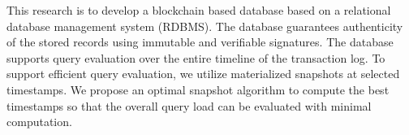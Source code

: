 This research is to develop a blockchain based database based on a relational database management system (RDBMS). The database guarantees authenticity of the stored records using immutable and verifiable signatures.  The database supports query evaluation over the entire timeline of the transaction log. To support efficient query evaluation, we utilize materialized snapshots at selected timestamps. We propose an optimal snapshot algorithm to compute the best timestamps so that the overall query load can be evaluated with minimal computation.
